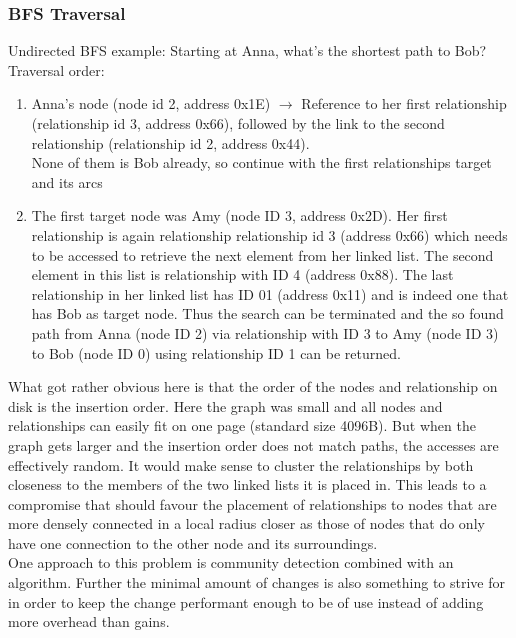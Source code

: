 \documentclass[a4paper,10pt]{article}
\begin{document}
        \subsubsection{BFS Traversal}
            Undirected BFS example: Starting at Anna, what's the shortest path to Bob? \\
            Traversal order:
            \begin{enumerate}
             \item Anna's node (node id 2, address 0x1E) $\rightarrow$ Reference to her first relationship (relationship id 3, address 0x66), followed by the link to the second relationship (relationship id 2, address 0x44). \\
             None of them is Bob already, so continue with the first relationships target and its arcs
             \item The first target node was Amy (node ID 3, address 0x2D). Her first relationship is again relationship relationship id 3 (address 0x66) which needs to be accessed to retrieve the next element from her linked list. The second element in this list is relationship with ID 4 (address 0x88). The last relationship in her linked list has ID 01 (address 0x11) and is indeed one that has Bob as target node. Thus the search can be terminated and the so found path from Anna (node ID 2) via relationship with ID 3 to Amy (node ID 3) to Bob (node ID 0) using relationship ID 1 can be returned.
            \end{enumerate}
            What got rather obvious here is that the order of the nodes and relationship on disk is the insertion order. Here the graph was small and all nodes and relationships can easily fit on one page (standard size 4096B). But when the graph gets larger and the insertion order does not match paths, the accesses are effectively random. It would make sense to cluster the relationships by both closeness to the members of the two linked lists it is placed in. This leads to a compromise that should favour the placement of relationships to nodes that are more densely connected in a local radius closer as those of nodes that do only have one connection to the other node and its surroundings. \\
            One approach to this problem is community detection combined with an algorithm. Further the minimal amount of changes is also something to strive for in order to keep the change performant enough to be of use instead of adding more overhead than gains. 
            
\end{document}
